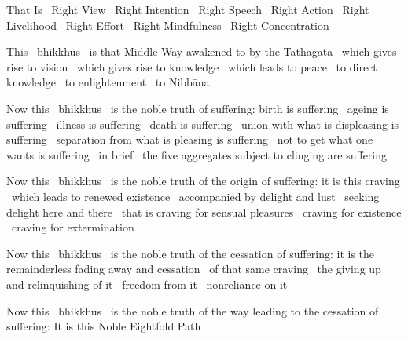 \begin{english-only-hang}
  That Is \breathmark\ Right View \breathmark\ Right Intention \breathmark\ Right Speech \breathmark\ Right Action \breathmark\ Right Livelihood \breathmark\ Right Effort \breathmark\ Right Mindfulness \breathmark\ Right Concentration
\end{english-only-hang}

\begin{english-only-hang}
  This \breathmark\ bhikkhus \breathmark\ is that Middle Way awakened to by the Tathāgata \breathmark\ which gives rise to vision \breathmark\ which gives rise to knowledge \breathmark\ which leads to peace \breathmark\ to direct knowledge \breathmark\ to enlightenment \breathmark\ to Nibbāna
\end{english-only-hang}

\begin{english-only-hang}
  Now this \breathmark\ bhikkhus \breathmark\ is the noble truth of suffering: birth is suffering \breathmark\ ageing is suffering \breathmark\ illness is suffering \breathmark\ death is suffering \breathmark\ union with what is displeasing is suffering \breathmark\ separation from what is pleasing is suffering \breathmark\ not to get what one wants is suffering \breathmark\ in brief \breathmark\ the five aggregates subject to clinging are suffering
\end{english-only-hang}

\begin{english-only-hang}
  Now this \breathmark\ bhikkhus \breathmark\ is the noble truth of the origin of suffering: it is this craving \breathmark\ which leads to renewed existence \breathmark\ accompanied by delight and lust \breathmark\ seeking delight here and there \breathmark\ that is craving for sensual pleasures \breathmark\ craving for existence \breathmark\ craving for extermination
\end{english-only-hang}

\begin{english-only-hang}
  Now this \breathmark\ bhikkhus \breathmark\ is the noble truth of the cessation of suffering: it is the remainderless fading away and cessation \breathmark\ of that same craving \breathmark\ the giving up and relinquishing of it \breathmark\ freedom from it \breathmark\ nonreliance on it
\end{english-only-hang}

\begin{english-only-hang}
  Now this \breathmark\ bhikkhus \breathmark\ is the noble truth of the way leading to the cessation of suffering: It is this Noble Eightfold Path
\end{english-only-hang}

